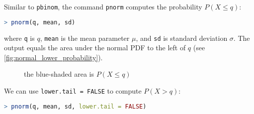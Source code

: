 Similar to \verb|pbinom|, the command \verb|pnorm| computes the probability \( P(X \leq q) \):
\begin{lstlisting}[language=R]
> pnorm(q, mean, sd)
\end{lstlisting}
where \verb|q| is \( q \), \verb|mean| is the mean parameter \( \mu \), and \verb|sd| is standard deviation \( \sigma \).
The output equals the area under the normal PDF to the left of \( q \) (see \autoref{fig:normal_lower_probability}).
\begin{figure}[t]
\begin{center}
\end{center}
\caption{the blue-shaded area is \( P(X \leq q) \)}
\label{fig:normal_lower_probability}
\end{figure}

We can use \verb|lower.tail = FALSE| to compute \( P(X > q) \):
\begin{lstlisting}[language=R]
> pnorm(q, mean, sd, lower.tail = FALSE)
\end{lstlisting}

